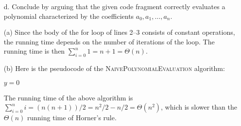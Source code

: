 \begin{enumerate}
{\begin{enumerate}
\item[d.] Conclude by arguing that the given code fragment correctly evaluates
a polynomial characterized by the coefficients $a_0, a_1, \dots, a_n$.
\end{enumerate}
}

\newpage

\begin{framed}
\begin{enumerate}
  \item[(a)] Since the body of the for loop of lines 2{--}3 consists of constant
    operations, the running time depends on the number of iterations of the
    loop. The running time is then $\sum_{i=0}^n 1 = n + 1 = \Theta(n)$.

\item[(b)] Here is the pseudocode of the \textsc{NaivePolynomialEvaluation}
algorithm:\\
\begin{algorithm}[H]
\SetAlgoNoEnd\DontPrintSemicolon%
 \nl $y = 0$\;
 \nl {}
\end{algorithm}

The running time of the above algorithm is
$\sum_{i=0}^n i = (n (n + 1))/2 = n^2/2 - n/2 = \Theta(n^2)$, which is slower
than the $\Theta(n)$ running time of Horner's rule.


\end{enumerate}
\end{framed}
\end{enumerate}
